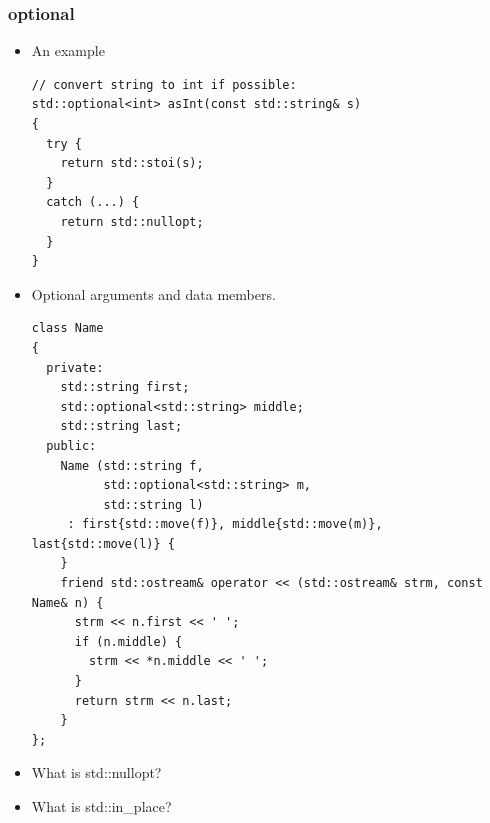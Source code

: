 \documentclass[a4paper,11pt,twoside]{book}
\begin{document}
\subsubsection{optional}
\begin{itemize}
\item An example
\begin{lstlisting}
// convert string to int if possible:
std::optional<int> asInt(const std::string& s)
{
  try {
    return std::stoi(s);
  }
  catch (...) {
    return std::nullopt;
  }
}
\end{lstlisting}
\item Optional arguments and data members.
\begin{lstlisting}
class Name
{
  private:
    std::string first;
    std::optional<std::string> middle;
    std::string last;
  public:
    Name (std::string f,
          std::optional<std::string> m,
          std::string l)
     : first{std::move(f)}, middle{std::move(m)}, last{std::move(l)} {
    }
    friend std::ostream& operator << (std::ostream& strm, const Name& n) {
      strm << n.first << ' ';
      if (n.middle) {
        strm << *n.middle << ' ';
      }
      return strm << n.last;
    }
};
\end{lstlisting}
\item What is std::nullopt? 
\item What is std::in\_place?
\end{itemize}
\end{document}
